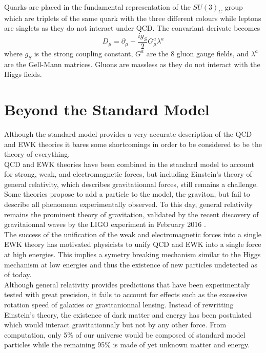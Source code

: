     Quarks are placed in the fundamental representation of the $ SU(3)_C $ group which are triplets of the same quark with the three different colours while leptons are singlets as they do not interact under QCD. The convariant derivate becomes
    \begin{equation}
      D_\mu = \partial_\mu - \frac{i g_S}{2} G^a_\mu \lambda^a
    \end{equation}
    where $ g_S $ is the strong coupling constant, $ G^a $ are the 8 gluon gauge fields, and $ \lambda^a $ are the Gell-Mann matrices. Gluons are massless as they do not interact with the Higgs fields.

  \section{Beyond the Standard Model}

    Although the standard model provides a very accurate description of the QCD and EWK theories it bares some shortcomings in order to be considered to be the theory of everything. \\

    QCD and EWK theories have been combined in the standard model to account for strong, weak, and electromagnetic forces, but including Einstein's theory of general relativity, which describes gravitationnal forces, still remains a challenge. Some theories propose to add a particle to the model, the graviton, but fail to describe all phenomena experimentally observed. To this day, general relativity remains the prominent theory of gravitation, validated by the recent discovery of gravitaionnal waves by the LIGO experiment in February 2016 \cite{PhysRevLett.116.061102}. \\

    The success of the unification of the weak and electromagnetic forces into a single EWK theory has motivated physicists to unify QCD and EWK into a single force at high energies. This implies a symetry breaking mechanism similar to the Higgs mechanism at low energies and thus the existence of new particles undetected as of today. \\

    Although general relativity provides predictions that have been experimentaly tested with great precision, it fails to account for effects such as the excessive rotation speed of galaxies or gravitanionnal lensing. Instead of rewritting Einstein's theory, the existence of dark matter and energy has been postulated which would interact gravitationnaly but not by any other force. From computation, only 5\% of our universe would be composed of standard model particles while the remaining 95\% is made of yet unknown matter and energy. \\

